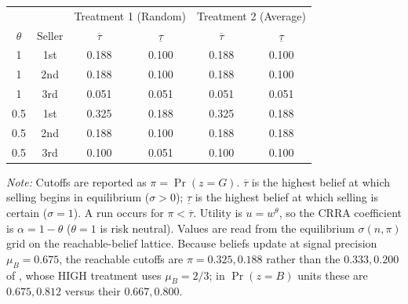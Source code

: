 \begingroup
\centering
\small
\begin{tabular}{cc|cc|cc}
\toprule
 & & \multicolumn{2}{c|}{Treatment 1 (Random)} & \multicolumn{2}{c}{Treatment 2 (Average)} \\
$\theta$ & Seller & $\overline{\tau}$ & $\underline{\tau}$ & $\overline{\tau}$ & $\underline{\tau}$ \\
\midrule
1 & 1st & 0.188 & 0.100 & 0.188 & 0.100 \\
1 & 2nd & 0.188 & 0.100 & 0.188 & 0.100 \\
1 & 3rd & 0.051 & 0.051 & 0.051 & 0.051 \\
\midrule
0.5 & 1st & 0.325 & 0.188 & 0.325 & 0.188 \\
0.5 & 2nd & 0.188 & 0.100 & 0.188 & 0.188 \\
0.5 & 3rd & 0.100 & 0.051 & 0.100 & 0.100 \\
\bottomrule
\end{tabular}
\par
\vspace{0.5em}
\footnotesize
\textit{Note:} Cutoffs are reported as $\pi = \Pr(z = G)$. $\overline{\tau}$ is the highest belief at which selling begins in equilibrium ($\sigma > 0$); $\underline{\tau}$ is the highest belief at which selling is certain ($\sigma = 1$). A run occurs for $\pi < \overline{\tau}$. Utility is $u = w^{\theta}$, so the CRRA coefficient is $\alpha = 1 - \theta$ ($\theta = 1$ is risk neutral). Values are read from the equilibrium $\sigma(n, \pi)$ grid on the reachable-belief lattice. Because beliefs update at signal precision $\mu_B = 0.675$, the reachable cutoffs are $\pi = 0.325, 0.188$ rather than the $0.333, 0.200$ of \cite{magnani2020dynamic}, whose HIGH treatment uses $\mu_B = 2/3$; in $\Pr(z = B)$ units these are $0.675, 0.812$ versus their $0.667, 0.800$.
\endgroup
